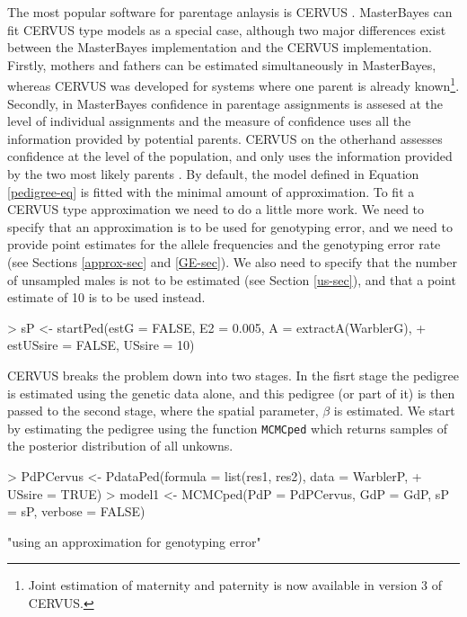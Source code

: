 \documentclass{article}
\begin{document}
The most popular software for parentage anlaysis is CERVUS \citep{Marshall.1998}.  MasterBayes can fit CERVUS type models as a special case, although two major differences exist between the MasterBayes implementation and the CERVUS implementation.  Firstly,  mothers and fathers can be estimated simultaneously in MasterBayes, whereas CERVUS was developed for systems where one parent is already known\footnote{Joint estimation of maternity and paternity is now available in version 3 of CERVUS.}.  Secondly, in MasterBayes confidence in parentage assignments is assesed at the level of individual assignments and the measure of confidence uses all the information provided by potential parents.  CERVUS on the otherhand assesses confidence at the level of the population, and only uses the information provided by the two most likely parents \citep{Nielsen.2001}. By default, the model defined in Equation \ref{pedigree-eq} is fitted with the minimal amount of approximation.  To fit a CERVUS type approximation we need to do a little more work.  We need to specify that an approximation is to be used for genotyping error, and we need to provide point estimates for the allele frequencies and the genotyping error rate (see Sections \ref{approx-sec} and \ref{GE-sec}).  We also need to specify that the number of unsampled males is not to be estimated (see Section \ref{us-sec}), and that a point estimate of 10 is to be used instead. 

\begin{Schunk}
\begin{Sinput}
> sP <- startPed(estG = FALSE, E2 = 0.005, A = extractA(WarblerG), 
+     estUSsire = FALSE, USsire = 10)
\end{Sinput}
\end{Schunk}


CERVUS breaks the problem down into two stages.  In the fisrt stage the pedigree is estimated using the genetic data alone, and this pedigree (or part of it) is then passed to the second stage, where the spatial parameter, $\beta$ is estimated.  We start by estimating the pedigree using the function \texttt{MCMCped} which returns samples of the posterior distribution of all unkowns.

\begin{Schunk}
\begin{Sinput}
> PdPCervus <- PdataPed(formula = list(res1, res2), data = WarblerP, 
+     USsire = TRUE)
> model1 <- MCMCped(PdP = PdPCervus, GdP = GdP, sP = sP, verbose = FALSE)
\end{Sinput}
\begin{Soutput}
[1] "using an approximation for genotyping error"
\end{Soutput}
\end{Schunk}
\end{document}
